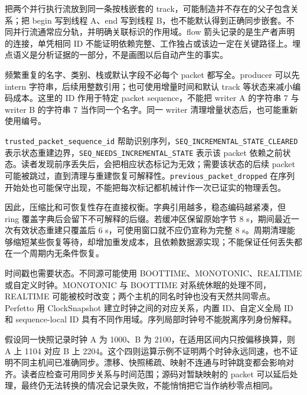 \documentclass[UTF8,fontset=fandol,openany,11pt]{ctexbook}
\begin{document}
把两个并行执行流放到同一条按栈嵌套的 track，可能制造并不存在的父子包含关系；把 begin 写到线程 A、end 写到线程 B，也不能默认得到正确同步嵌套。不同并行流通常应分轨，并明确关联标识的作用域。flow 箭头记录的是生产者声明的连接，单凭相同 ID 不能证明依赖完整、工作独占或该边一定在关键路径上。埋点语义是分析证据的一部分，不是画图以后自动产生的事实。\cite{pf-trackevent}


频繁重复的名字、类别、栈或默认字段不必每个 packet 都写全。producer 可以先 intern 字符串，后续用整数引用；也可使用增量时间和默认 track 等状态来减小编码成本。这里的 ID 作用于特定 packet sequence，不能把 writer A 的字符串 7 与 writer B 的字符串 7 当作同一个名字。同一 writer 清理增量状态后，也可能重新使用编号。\cite{pf-packet}\cite{pf-reader}


\texttt{trusted\_\allowbreak{}packet\_\allowbreak{}sequence\_\allowbreak{}id} 帮助识别序列，\texttt{SEQ\_\allowbreak{}INCREMENTAL\_\allowbreak{}STATE\_\allowbreak{}CLEARED} 表示状态重建边界，\texttt{SEQ\_\allowbreak{}NEEDS\_\allowbreak{}INCREMENTAL\_\allowbreak{}STATE} 表示该 packet 依赖之前状态。读者发现前序丢失后，会把相应状态标记为无效；需要该状态的后续 packet 可能被跳过，直到清理与重建恢复可解释性。\texttt{previous\_\allowbreak{}packet\_\allowbreak{}dropped} 在序列开始处也可能保守出现，不能把每次标记都机械计作一次已证实的物理丢包。\cite{pf-packet}\cite{pf-reader}


因此，压缩比和可恢复性存在直接权衡。字典引用越多，稳态编码越紧凑，但 ring 覆盖字典后会留下不可解释的后缀。若缓冲区保留原始字节 8 s，期间最近一次有效状态重建只覆盖后 6 s，可使用窗口就不应仍宣称为完整 8 s。周期清理能够缩短某些恢复等待，却增加重发成本，且依赖数据源实现；不能保证任何丢失都在一个周期内无条件恢复。\cite{pf-config}\cite{pf-reader}


时间戳也需要状态。不同源可能使用 BOOTTIME、MONOTONIC、REALTIME 或自定义时钟。MONOTONIC 与 BOOTTIME 对系统休眠的处理不同，REALTIME 可能被校时改变；两个主机的同名时钟也没有天然共同零点。Perfetto 用 ClockSnapshot 建立时钟之间的对应关系，内置 ID、自定义全局 ID 和 sequence-local ID 具有不同作用域。序列局部时钟号不能脱离序列身份解释。\cite{pf-clocks}\cite{pf-reader}


假设同一快照记录时钟 A 为 1000、B 为 2100，在适用区间内只按偏移换算，则 A 上 1104 对应 B 上 2204。这个四则运算示例不证明两个时钟永远同速，也不证明不同主机间已准确同步。漂移、快照稀疏、映射不连通与时钟跳变都会影响对齐。读者应检查可用同步关系与时间范围；源码对暂缺映射的 packet 可以延后处理，最终仍无法转换的情况会记录失败，不能悄悄把它当作纳秒零点相同。\cite{pf-clocks}\cite{pf-reader}
\end{document}
